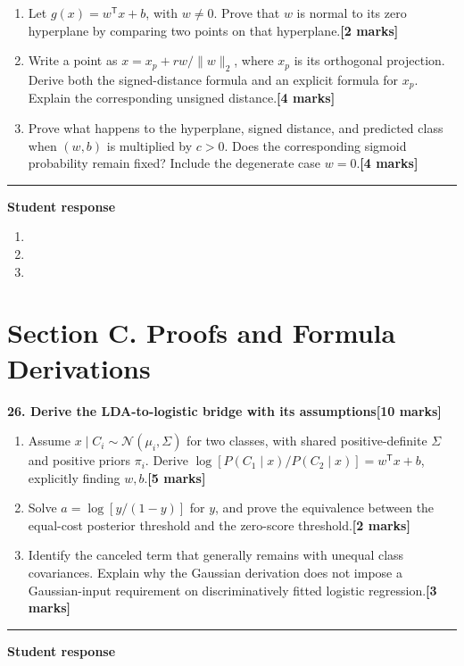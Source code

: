 \documentclass[11pt,a4paper]{article}
\newlength{\BlankAnswerHeight}\setlength{\BlankAnswerHeight}{16mm}
\newcommand{\AnswerBlank}{\leavevmode\par\vspace{\BlankAnswerHeight}}
\begin{document}
\begin{enumerate}[label=(\alph*),leftmargin=8mm,itemsep=3pt]
\item Let \(g(x)=w^{\mathsf T}x+b\), with \(w\ne0\). Prove that \(w\) is normal to its zero hyperplane by comparing two points on that hyperplane.\hfill\textbf{[2 marks]}
\item Write a point as \(x=x_p+r w/\|w\|_2\), where \(x_p\) is its orthogonal projection. Derive both the signed-distance formula and an explicit formula for \(x_p\). Explain the corresponding unsigned distance.\hfill\textbf{[4 marks]}
\item Prove what happens to the hyperplane, signed distance, and predicted class when \((w,b)\) is multiplied by \(c>0\). Does the corresponding sigmoid probability remain fixed? Include the degenerate case \(w=0\).\hfill\textbf{[4 marks]}
\end{enumerate}\par\medskip\hrule\medskip\textbf{Student response}\par
\begin{enumerate}[label=(\alph*),leftmargin=8mm,itemsep=3pt]
\item
\AnswerBlank
\item
\AnswerBlank
\item
\AnswerBlank
\end{enumerate}
\newpage\section*{Section C. Proofs and Formula Derivations}
\textbf{26. Derive the LDA-to-logistic bridge with its assumptions}\hfill\textbf{[10 marks]}\par\medskip
\begin{enumerate}[label=(\alph*),leftmargin=8mm,itemsep=3pt]
\item Assume \(x\mid C_i\sim\mathcal N(\mu_i,\Sigma)\) for two classes, with shared positive-definite \(\Sigma\) and positive priors \(\pi_i\). Derive \(\log[P(C_1\mid x)/P(C_2\mid x)]=w^{\mathsf T}x+b\), explicitly finding \(w,b\).\hfill\textbf{[5 marks]}
\item Solve \(a=\log[y/(1-y)]\) for \(y\), and prove the equivalence between the equal-cost posterior threshold and the zero-score threshold.\hfill\textbf{[2 marks]}
\item Identify the canceled term that generally remains with unequal class covariances. Explain why the Gaussian derivation does not impose a Gaussian-input requirement on discriminatively fitted logistic regression.\hfill\textbf{[3 marks]}
\end{enumerate}\par\medskip\hrule\medskip\textbf{Student response}\par
\end{document}
